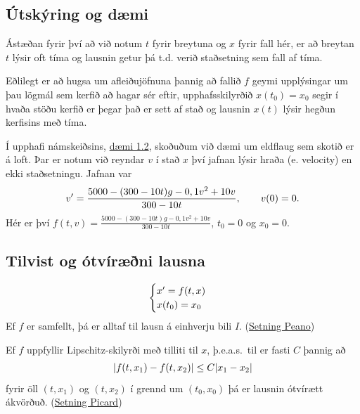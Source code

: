 \documentclass[letterpaper,10pt,icelandic]{sphinxmanual}
\begin{document}
\subsection{Útskýring og dæmi}
\label{kafli06:utskyring-og-daemi}
Ástæðan fyrir því að við notum \(t\) fyrir breytuna og \(x\) fyrir fall
hér, er að breytan \(t\) lýsir oft tíma og lausnin getur þá t.d. verið staðsetning
sem fall af tíma.

Eðlilegt er að hugsa um afleiðujöfnuna þannig að fallið \(f\) geymi upplýsingar
um þau lögmál sem kerfið að hagar sér eftir, upphafsskilyrðið \(x(t_0)=x_0\)
segir í hvaða stöðu kerfið er þegar það er sett af stað og
lausnin \(x(t)\) lýsir hegðun kerfisins með tíma.

Í upphafi námskeiðsins,
\href{https://notendur.hi.is/~bsm/stae405/kafli01.html\#daemi-eldflaug}{dæmi 1.2}, skoðuðum
við dæmi um eldflaug sem skotið er á loft. Þar er notum við reyndar \(v\) í stað
\(x\) því jafnan lýsir hraða (e. velocity) en ekki staðsetningu.
Jafnan var
\begin{gather}
\begin{split}v' = \frac{5000-(300-10t)g-0,1v^2+10v}{300-10t},   \qquad v(0)=0.\end{split}\notag
\end{gather}
Hér er því \(f(t,v) = \frac{5000-(300-10t)g-0,1v^2+10v}{300-10t}\), \(t_0=0\)
og \(x_0 = 0\).


\subsection{Tilvist og ótvíræðni lausna}
\label{kafli06:tilvist-og-otviraeni-lausna}\label{kafli06:index-2}\begin{gather}
\begin{split}\begin{cases}
x' = f(t,x)\\
x(t_0) = x_0
\end{cases}\end{split}\notag
\end{gather}
Ef \(f\) er samfellt, þá er alltaf til lausn á einhverju bili
\(I\). (\href{https://en.wikipedia.org/wiki/Peano\_existence\_theorem}{Setning Peano})

Ef \(f\) uppfyllir Lipschitz-skilyrði með tilliti til \(x\),
þ.e.a.s. til er fasti \(C\) þannig að
\begin{gather}
\begin{split}|f(t,x_1) - f(t,x_2)| \leq C|x_1 - x_2|\end{split}\notag
\end{gather}
fyrir öll \((t,x_1)\) og \((t,x_2)\) í grennd um
\((t_0, x_0)\) þá er lausnin ótvírætt ákvörðuð. (\href{https://en.wikipedia.org/wiki/Picard\%E2\%80\%93Lindel\%C3\%B6f\_theorem}{Setning Picard})
\end{document}
